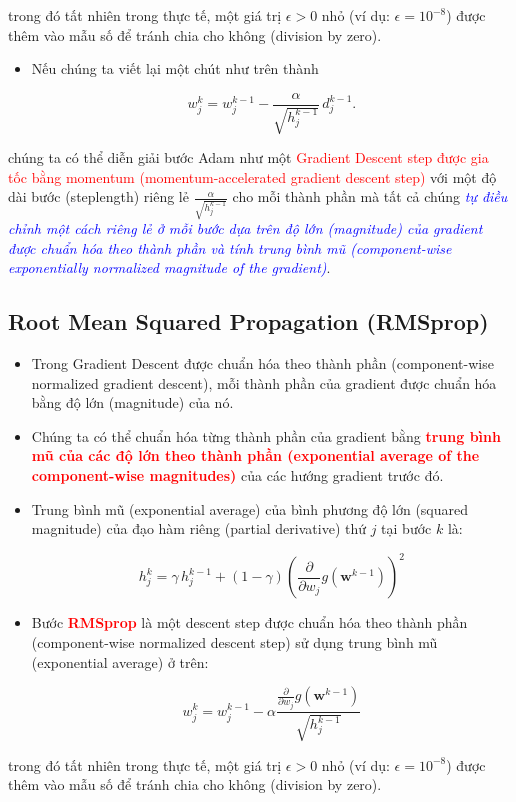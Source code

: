 \documentclass{book}
\begin{document}
trong đó tất nhiên trong thực tế, một giá trị $\epsilon > 0$ nhỏ (ví dụ: $\epsilon = 10^{-8}$) được thêm vào mẫu số để tránh chia cho không (division by zero).
\begin{itemize}
    \item Nếu chúng ta viết lại một chút như trên thành

    \begin{equation*}
        w_j^k = w_j^{k-1} - \frac{\alpha}{\sqrt{h_j^{k-1}}} \, d^{k-1}_j.
    \end{equation*}
\end{itemize}
chúng ta có thể diễn giải bước Adam như một \textcolor{red}{Gradient Descent step được gia tốc bằng momentum (momentum-accelerated gradient descent step)} với một độ dài bước (steplength) riêng lẻ $\frac{\alpha}{\sqrt{h_j^{k-1}}}$ cho mỗi thành phần mà tất cả chúng \textit{\textcolor{blue}{tự điều chỉnh một cách riêng lẻ ở mỗi bước dựa trên độ lớn (magnitude) của gradient được chuẩn hóa theo thành phần và tính trung bình mũ (component-wise exponentially normalized magnitude of the gradient)}}.
\subsection{Root Mean Squared Propagation (RMSprop)}
\begin{itemize}
    \item Trong Gradient Descent được chuẩn hóa theo thành phần (component-wise normalized gradient descent), mỗi thành phần của gradient được chuẩn hóa bằng độ lớn (magnitude) của nó.
    \item Chúng ta có thể chuẩn hóa từng thành phần của gradient bằng \textbf{\textcolor{red}{trung bình mũ của các độ lớn theo thành phần (exponential average of the component-wise magnitudes)}} của các hướng gradient trước đó.

    \item Trung bình mũ (exponential average) của bình phương độ lớn (squared magnitude) của đạo hàm riêng (partial derivative) thứ $j$ tại bước $k$ là:


    \begin{equation*}
        h_j^k = \gamma \, h_j^{k-1} + \left(1 - \gamma\right)\left(\frac{\partial}{\partial w_j}g\left(\mathbf{w}^{k-1}\right)\right)^2
    \end{equation*}
    \item Bước \textbf{\textcolor{red}{RMSprop}} là một descent step được chuẩn hóa theo thành phần (component-wise normalized descent step) sử dụng trung bình mũ (exponential average) ở trên:

    \begin{equation*}
        w_j^k = w_j^{k-1} - \alpha \frac{\frac{\partial}{\partial w_j} g\left(\mathbf{w}^{k-1}\right)}{\sqrt{h_j^{k-1}}}
    \end{equation*}
\end{itemize}
trong đó tất nhiên trong thực tế, một giá trị $\epsilon > 0$ nhỏ (ví dụ: $\epsilon = 10^{-8}$) được thêm vào mẫu số để tránh chia cho không (division by zero).
\end{document}
